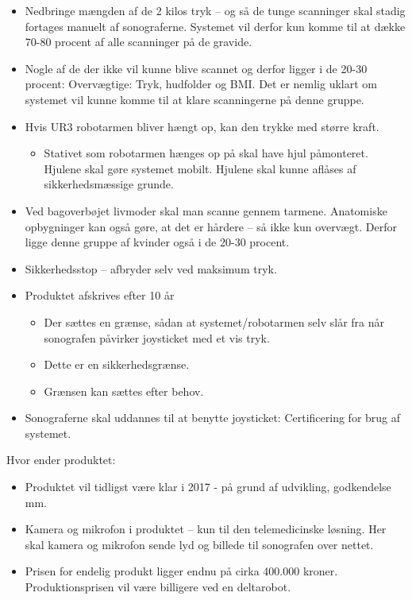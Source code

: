 \begin{itemize}
\item Nedbringe mængden af de 2 kilos tryk – og så de tunge scanninger skal stadig fortages manuelt af sonograferne. Systemet vil derfor kun komme til at dække 70-80 procent af alle scanninger på de gravide. 
\item Nogle af de der ikke vil kunne blive scannet og derfor ligger i de 20-30 procent: Overvægtige: Tryk, hudfolder og BMI. Det er nemlig uklart om systemet vil kunne komme til at klare scanningerne på denne gruppe.
\item Hvis UR3 robotarmen bliver hængt op, kan den trykke med større kraft. 
\begin{itemize}
\item Stativet som robotarmen hænges op på skal have hjul påmonteret. Hjulene skal gøre systemet mobilt. Hjulene skal kunne aflåses af sikkerhedsmæssige grunde.
\end{itemize}
\item Ved bagoverbøjet livmoder skal man scanne gennem tarmene. Anatomiske opbygninger kan også gøre, at det er hårdere – så ikke kun overvægt. Derfor ligge denne gruppe af kvinder også i de 20-30 procent.
\item Sikkerhedsstop – afbryder selv ved maksimum tryk. 
\item Produktet afskrives efter 10 år
\begin{itemize}
\item Der sættes en grænse, sådan at systemet/robotarmen selv slår fra når sonografen påvirker joysticket med et vis tryk.
\item Dette er en sikkerhedsgrænse.
\item Grænsen kan sættes efter behov.
\end{itemize}
\item Sonograferne skal uddannes til at benytte joysticket: Certificering for brug af systemet.
\end{itemize}
Hvor ender produktet:
\begin{itemize}
\item Produktet vil tidligst være klar i 2017 - på grund af udvikling, godkendelse mm. 
\item Kamera og mikrofon i produktet – kun til den telemedicinske løsning. Her skal kamera og mikrofon sende lyd og billede til sonografen over nettet. 
\item Prisen for endelig produkt ligger endnu på cirka 400.000 kroner. Produktionsprisen vil være billigere ved en deltarobot. 
\end{itemize}
